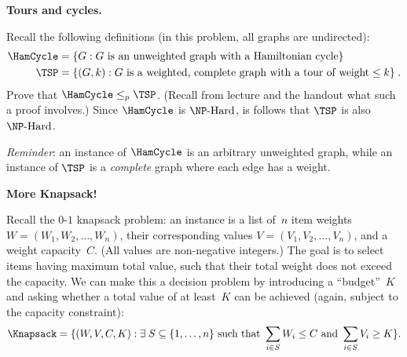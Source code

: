 \documentclass[11pt,addpoints]{exam}
\newcommand{\NPHard}{\NP\text{-Hard}}
\begin{document}
\begin{questions}

  \question[18] \textbf{Tours and cycles.}

  Recall the following definitions (in this problem, all graphs are undirected):
  \begin{align*}
    \HamCycle &= \set{ G : G \text{ is an unweighted graph with a Hamiltonian cycle}} \\
    \TSP &= \set{ (G, k) : G \text{ is a weighted, complete graph with a tour of weight} \leq k }
           \; \text.
  \end{align*}
  Prove that $\HamCycle \leq_p \TSP$.
  (Recall from lecture and the handout what such a proof involves.)
  Since $\HamCycle$ is $\NPHard$, is follows that $\TSP$ is also $\NPHard$.
  
  \emph{Reminder}: an instance of $\HamCycle$ is an arbitrary unweighted graph, while an instance of $\TSP$ is a \emph{complete} graph where each edge has a weight.

  \begin{solution}
    
  \end{solution}

  \question \textbf{More Knapsack!} 
  
  Recall the $0$-$1$ knapsack problem: an instance is a list of~$n$ item weights $W = (W_1, W_2, \ldots, W_n)$, their corresponding values $V = (V_1, V_2, \ldots, V_n)$, and a weight capacity~$C$.
  (All values are non-negative integers.)
  The goal is to select items having maximum total value, such that their total weight does not exceed the capacity.
  We can make this a decision problem by introducing a ``budget''~$K$ and asking whether a total value of at least~$K$ can be achieved (again, subject to the capacity constraint):
  \[ \Knapsack = \set{ (W, V, C, K) : \exists\; S\subseteq \set{1,\ldots,n} \text{ such that } \sum_{i\in S} W_{i} \leq C \text{ and } \sum_{i\in S} V_{i} \geq K }.
  \]


\end{questions}
\end{document}
